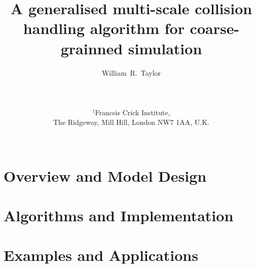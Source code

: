 \documentclass[12pt]{article}
\begin{document}
\title{\bf A generalised multi-scale collision handling algorithm for coarse-grainned simulation
}

\author{
William~R.~Taylor\\ \\ \\ \\
$^\dagger$Francsis Crick Institute,\\
The Ridgeway, Mill Hill, London NW7 1AA, U.K.\\ \\ 
}
\begin{singlespace}
\maketitle
\end{singlespace}
\clearpage
%
\section{Overview and Model Design}

\clearpage
\section{Algorithms and Implementation}

\clearpage

\clearpage
\section{Examples and Applications}


\clearpage
%
%
%
\end{document}
